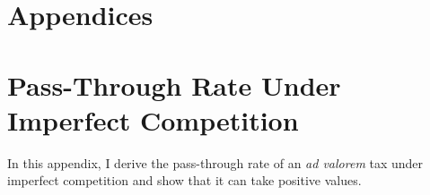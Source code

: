 \documentclass[12pt]{article}
\begin{document}










	
	
\newpage
\appendix
\section*{Appendices}

\section{Pass-Through Rate Under Imperfect Competition}
\label{sec:ic}
In this appendix, I derive the pass-through rate of an \textit{ad valorem} tax under imperfect competition and
show that it can take positive values. 
\end{document}
